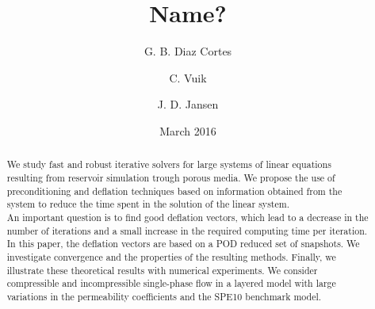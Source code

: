 \documentclass[12pt]{article}
\title{Name?}
\author[1]{G. B. Diaz Cortes}
\author[1]{C. Vuik}
\author[2]{J. D. Jansen}
\affil[1]{Department of Applied Mathematics, TU Delft}
\affil[2]{Department of Geoscience \& Engineering, TU Delft}
\date{March 2016}
\begin{document}

\maketitle
\begin{abstract}
     We study fast and robust iterative solvers for large systems of  linear equations resulting from reservoir
     simulation trough porous media. We propose the use of preconditioning and deflation techniques based on 
     information obtained from the system to reduce the time spent in the solution of the linear system.\\
     An important question is to find good deflation vectors, which lead to a decrease in the number of iterations 
     and a small increase in the required computing time per iteration. In this paper, the deflation vectors are 
     based on a POD reduced set of snapshots. We investigate convergence and the properties of the resulting methods. 
     Finally, we illustrate these theoretical results with numerical experiments.  
 We consider compressible and incompressible single-phase flow in a layered model with large variations in the 
 permeability coefficients and the SPE10 benchmark model.\\
\end{abstract}
\end{document}
